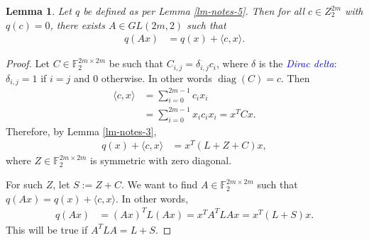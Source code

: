 \documentclass[12pt,a4paper]{article}
\newcommand{\mb}[1]{\mathbb{#1}}
\newcommand{\F}{\mb{F}}
\newcommand{\Emph}[1]{\emph{\textcolor{blue}{#1}}}
\newcommand{\diag}[1]{\operatorname{diag}\left(#1\right)}
\newtheorem{Lemma}{Lemma}
\begin{document}
\begin{Lemma}
\label{lm-notes-4}
Let $q$ be defined as per Lemma \ref{lm-notes-5}.
Then for all $c \in Z_2^{2 m}$ with $q(c)=0$, there exists $A \in GL(2 m, 2)$ such that
\begin{align*}
q(A x) &= q(x) + \langle c, x \rangle.
\end{align*}
\end{Lemma}

\begin{proof}
Let $C \in \F_2^{2 m \times 2 m}$ be such that $C_{i,j} = \delta_{i,j} c_i$, where $\delta$ is the
\Emph{Dirac delta}: $\delta_{i,j}=1$ if $i=j$ and $0$ otherwise.
In other words $\diag{C} = c$.
Then
\begin{align*}
\langle c, x \rangle
&=
\sum_{i=0}^{2m-1} c_i x_i
\\
&=
\sum_{i=0}^{2m-1} x_i c_i x_i
=
x^T C x.
\end{align*}
Therefore, by Lemma \ref{lm-notes-3},
\begin{align*}
q(x) + \langle c, x \rangle
&=
x^T (L + Z + C) x,
\end{align*}
where $Z \in \F_2^{2 m \times 2 m}$ is symmetric with zero diagonal.

For such $Z$, let $S := Z + C$.
We want to find $A \in \F_2^{2 m \times 2 m}$ such that $q(A x) = q(x) + \langle c, x \rangle.$
In other words,
\begin{align*}
q(A x)
&=
(A x)^T L (A x)
=
x^T A^T L A x
=
x^T (L + S) x.
\end{align*}
This will be true if $A^T L A = L + S.$


\end{proof}
\end{document}
